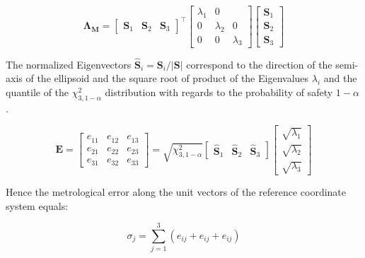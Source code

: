 \documentclass[5p,times,procedia]{elsarticle}
\begin{document}
\begin{equation}
	\mathbf{\Lambda_{M}} =
	\begin{bmatrix}
		\mathbf{S}_1^{} & \mathbf{S}_2^{} & \mathbf{S}_3^{}
	\end{bmatrix}^{\top}
	\begin{bmatrix}
		\lambda_1^{} & 0 \\
		0 & \lambda_2^{} &  0 \\
		0 & 0 &  \lambda_3^{}
	\end{bmatrix}
	\begin{bmatrix}
		\mathbf{S}_1^{} \\
		\mathbf{S}_2^{} \\
		\mathbf{S}_3^{}
	\end{bmatrix}
\end{equation}

The normalized Eigenvectors $\mathbf{\hat{S}}_i = \mathbf{S}_i / |\mathbf{S}|$ correspond to the direction of the semi-axis of the ellipsoid and the square root of product of the Eigenvalues $\lambda_i$ and the quantile of the $\chi^2_{3,1-\alpha} $ distribution with regards to the probability of safety $1-\alpha$ \cite{Pelzer1995}.


\begin{equation}
	\mathbf{E} =
	\begin{bmatrix}
		e_{11}^{} & e_{12}^{} & e_{13}^{} \\
		e_{21}^{} & e_{22}^{} & e_{23}^{} \\
		e_{31}^{} & e_{32}^{} & e_{33}^{}
	\end{bmatrix}
	=
	\sqrt{ \chi^2_{3,1-\alpha}}
	\begin{bmatrix}
		\mathbf{\hat{S}}_1^{} & \mathbf{\hat{S}}_2^{} & \mathbf{\hat{S}}_3^{}
	\end{bmatrix}
	\begin{bmatrix}
		\sqrt{\lambda_1^{}} \\
		\sqrt{\lambda_2^{}} \\
		\sqrt{\lambda_3^{}}
	\end{bmatrix}
\end{equation}

Hence the metrological error along the unit vectors of the reference coordinate system equals:

\begin{equation}
	\sigma_j = \sum_{j=1}^{3} \left( e_{ij} + e_{ij} + e_{ij}\right)
\end{equation}
\end{document}
